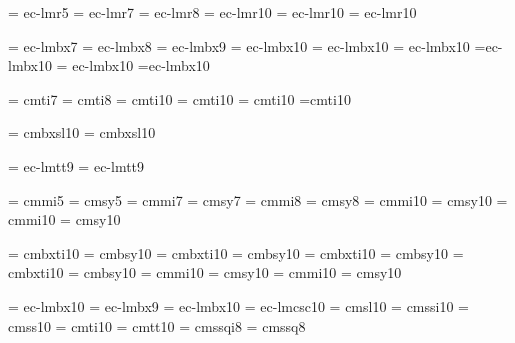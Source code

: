 \Font\prmfive	= ec-lmr5
\Font\prmseven	= ec-lmr7
\Font\prmeight	= ec-lmr8
\Font\prmten	= ec-lmr10
\Font\prmeleven = ec-lmr10 \sc \mh
\Font\prmtwelve = ec-lmr10 \sc \mi

\Font\prbseven	= ec-lmbx7
\Font\prbeight	= ec-lmbx8
\Font\prbnine	= ec-lmbx9
\Font\prbten	= ec-lmbx10
\Font\prbeleven = ec-lmbx10 \sc \mh
\Font\prbtwelve = ec-lmbx10 \sc \mi
\Font\prbfourteen=ec-lmbx10 \sc \mii
\Font\prbsixteen= ec-lmbx10 \sc \miii
\Font\prbeighteen=ec-lmbx10 \sc \miii

\Font\priseven	= cmti7
\Font\prieight	= cmti8
\Font\priten	= cmti10
\Font\prieleven = cmti10 \sc \mh
\Font\pritwelve = cmti10 \sc \mi
\Font\prifourteen=cmti10 \sc \mii

\Font\prbiten	= cmbxsl10
\Font\prbieleven= cmbxsl10 \sc \mh

\Font\lgseven	= ec-lmtt9
\Font\lgnine	= ec-lmtt9

\font\mifive	= cmmi5			\font\syfive	= cmsy5
\font\miseven	= cmmi7			\font\syseven	= cmsy7
\font\mieight	= cmmi8			\font\syeight	= cmsy8
\font\miten	= cmmi10		\font\syten	= cmsy10
\font\mieleven	= cmmi10 \sc \mh	\font\syeleven	= cmsy10 \sc \mh

\font\bmiten	 = cmbxti10		\font\bsyten	 = cmbsy10
\font\bmieleven	 = cmbxti10 \sc \mh	\font\bsyeleven	 = cmbsy10 \sc \mh
\font\bmitwelve	 = cmbxti10 \sc \mi	\font\bsytwelve	 = cmbsy10 \sc \mi
\font\bmifourteen= cmbxti10 \sc \mii	\font\bsyfourteen= cmbsy10 \sc \mii
\font\bmisixteen = cmmi10 \sc \miii	\font\bsysixteen = cmsy10  \sc \miii
\font\bmieighteen= cmmi10 \sc \miii	\font\bsyeighteen= cmsy10  \sc \miii


\font\bbften = ec-lmbx10
\font\bbfnine = ec-lmbx9
\Font\bbflten = ec-lmbx10 \sc \mi
\font\bscten = ec-lmcsc10
\font\bslten = cmsl10
\font\ssiten = cmssi10
\font\bssten = cmss10
\font\bitten = cmti10
\font\bttten = cmtt10
\font\ssqieight = cmssqi8
\font\ssqeight = cmssq8
